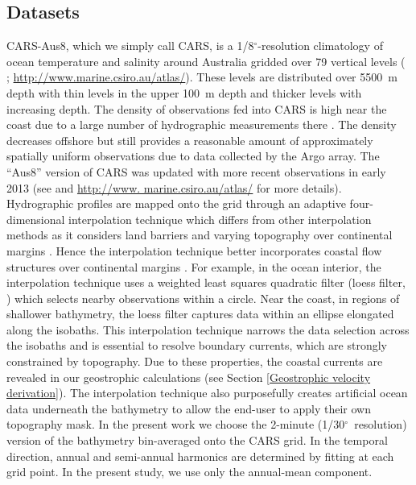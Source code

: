 \documentclass[preprint,3p,review,12pt]{elsarticle}
\newcommand{\dg}{$^{\circ}$}
\begin{document}
\subsection{Datasets} \label{Datasets}
CARS-Aus8, which we simply call CARS, is a 1/8\dg-resolution climatology of ocean temperature and salinity around Australia gridded over 79 vertical levels (\citeauthor{Ridgway2002} \citeyear{Ridgway2002}; \url{http://www.marine.csiro.au/atlas/}). These levels are distributed over \SI{5500}{\meter} depth with thin levels in the upper \SI{100}{\meter} depth and thicker levels with increasing depth. The density of observations fed into CARS is high near the coast due to a large number of hydrographic measurements there \citep{Ridgway2002}. The density decreases offshore but still provides a reasonable amount of approximately spatially uniform observations due to data collected by the Argo array. The ``Aus8'' version of CARS was updated with more recent observations in early 2013 (see \citeauthor{Duran2015} \citeyear{Duran2015} and \url{http://www. marine.csiro.au/atlas/} for more details). Hydrographic profiles are mapped onto the grid through an adaptive four-dimensional interpolation technique which differs from other interpolation methods as it considers land barriers and varying topography over continental margins \citep{Ridgway2002}. Hence the interpolation technique better incorporates coastal flow structures over continental margins \citep{Ridgway2002}. For example, in the ocean interior, the interpolation technique uses a weighted least squares quadratic filter (loess filter, \citeauthor{Cleveland1988} \citeyear{Cleveland1988}) which selects nearby observations within a circle. Near the coast, in regions of shallower bathymetry, the loess filter captures data within an ellipse elongated along the isobaths. This interpolation technique narrows the data selection across the isobaths and is essential to resolve boundary currents, which are strongly constrained by topography. Due to these properties, the coastal currents are revealed in our geostrophic calculations (see Section \ref{Geostrophic velocity derivation}). The interpolation technique also purposefully creates artificial ocean data underneath the bathymetry to allow the end-user to apply their own topography mask. In the present work we choose the 2-minute (1/30\dg~resolution) version of the \citet{Smith1997} bathymetry bin-averaged onto the CARS grid. In the temporal direction, annual and semi-annual harmonics are determined by fitting at each grid point. In the present study, we use only the annual-mean component.
\end{document}
